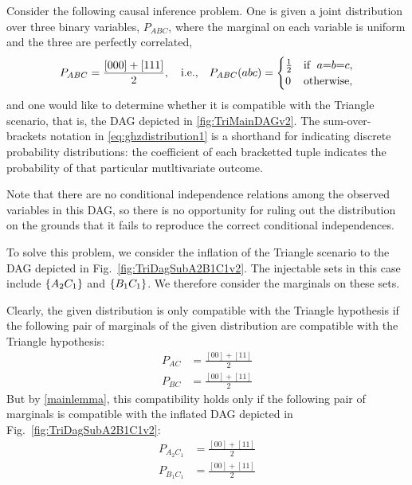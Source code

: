 Consider the following causal inference problem.  One is given a joint distribution over three binary variables, $P_{A B C}$, where the marginal on each variable is uniform and the three are perfectly correlated,
\begin{align}\label{eq:ghzdistribution1}
P_{A B C} =\frac{[000]+[111]}{2},\quad\text{i.e.,}\quad P_{A B C}(a b c)=\begin{cases}\tfrac{1}{2}&\text{if }\; a\mathord{=} b\mathord{=} c, \\ 0&\text{otherwise},\end{cases}
\end{align}
and one would like to determine whether it is compatible with the Triangle scenario, that is, the DAG depicted in \cref{fig:TriMainDAGv2}.  The sum-over-brackets notation in \cref{eq:ghzdistribution1} is a shorthand for indicating discrete probability distributions: the coefficient of each bracketted tuple indicates the probability of that particular mutltivariate outcome.

Note that there are no conditional independence relations among the observed variables in this DAG, so there is no opportunity for ruling out the distribution on the grounds that it fails to reproduce the correct conditional independences. 


To solve this problem, we consider the inflation of the Triangle scenario to the DAG depicted in Fig.~\ref{fig:TriDagSubA2B1C1v2}.  
The injectable sets in this case include $\left\lbrace A_2 C_1\right\rbrace$ and $\left\lbrace B_1 C_1\right\rbrace$.  We therefore consider the marginals on these sets.

Clearly, the given distribution is only compatible with the Triangle hypothesis if the following pair of marginals of the given distribution are compatible with the Triangle hypothesis:
\begin{align}
P_{A C} &= \frac{[00]+[11]}{2}\label{j1}\\
P_{B C} &= \frac{[00]+[11]}{2}\label{j2}
\end{align}
But by \cref{mainlemma}, this compatibility holds only if the following pair of marginals is compatible with the inflated DAG depicted in Fig.~\ref{fig:TriDagSubA2B1C1v2}:
\begin{align}
P_{A_2 C_1} &= \frac{[00]+[11]}{2} \label{k1}\\
P_{B_1 C_1} &= \frac{[00]+[11]}{2} \label{k2}
\end{align}

